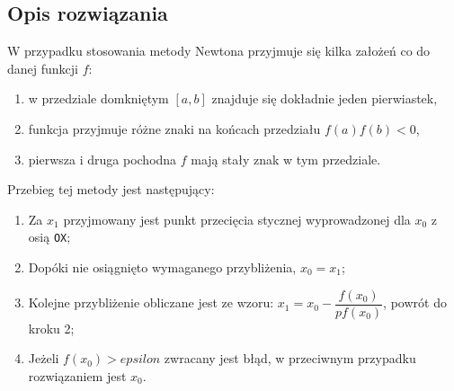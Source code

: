 \documentclass{classrep}
\begin{document}
	\subsection{Opis rozwiązania}
		W przypadku stosowania metody Newtona przyjmuje się kilka założeń co do danej funkcji $f$:
		\begin{enumerate}[1.]
			\item w przedziale domkniętym $[a,b]$ znajduje się dokładnie jeden pierwiastek,
			\item funkcja przyjmuje różne znaki na końcach przedziału $f(a)f(b)<0$,
			\item pierwsza i druga pochodna $f$ mają stały znak w tym przedziale.
		\end{enumerate}
		
		Przebieg tej metody jest następujący:
		\begin{enumerate}
			\item Za $x_1$ przyjmowany jest punkt przecięcia stycznej wyprowadzonej dla $x_0$ z osią \texttt{OX};
			\item Dopóki nie osiągnięto wymaganego przybliżenia, $x_0 = x_1$;
			\item Kolejne przybliżenie obliczane jest ze wzoru: $x_1 = x_0-\dfrac{f(x_0)}{pf(x_0)}$, powrót do kroku 2;
			\item Jeżeli $f(x_0)>epsilon$ zwracany jest błąd, w przeciwnym przypadku rozwiązaniem jest $x_0$.
		\end{enumerate}	
	
\end{document}

